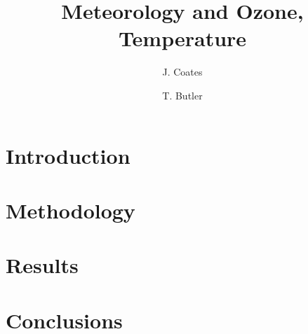 \documentclass[11pt,a4paper]{article}
\title{Meteorology and Ozone, Temperature}
\author[1]{J. Coates}
\author[1]{T. Butler}
\affil[1]{Institute for Advanced Sustainability Studies, Potsdam, Germany}
\begin{document}
\maketitle

\begin{abstract}
\end{abstract}

\section{Introduction} \label{s:introduction}
%

\section{Methodology} \label{s:methodology}


\section{Results} \label{s:results}
%

\section{Conclusions} \label{s:conclusions}
%


 
\end{document}
